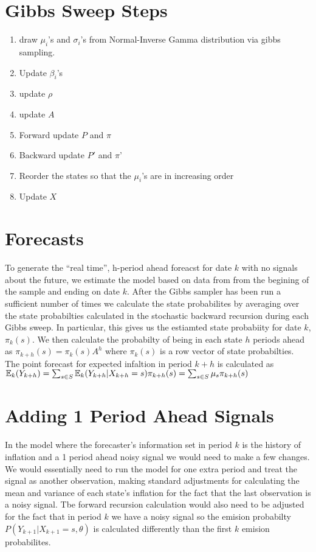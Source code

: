 \documentclass[12pt]{article}
\begin{document}
\section*{Gibbs Sweep Steps}
\begin{enumerate}
  \item draw $\mu_i$'s and $\sigma_i$'s from Normal-Inverse Gamma distribution 
  via gibbs sampling. 
  \item Update $\beta_i$'s
  \item update $\rho$
  \item update $A$
  \item Forward update $P$ and $\pi$
  \item Backward update $P'$ and $\pi$'
  \item Reorder the states so that the $\mu_i$'s are in increasing order
  \item Update $X$
\end{enumerate}

\section*{Forecasts}
To generate the ``real time'', h-period ahead foreacst for date $k$ with no signals about the future,
we estimate
the model based on data from from the begining of the sample and ending on date $k$. 
After the Gibbs sampler has been run a sufficient number of times we calculate the 
state probabilites by averaging over the state probabilties calculated in the stochastic
backward recursion during each Gibbs sweep. In particular, this gives us the estiamted 
state probabiity for date $k$, $\pi_k(s)$.  We then calculate the probabilty of being
in each state $h$ periods ahead as $\pi_{k+h}(s) = \pi_{k}(s) A^h $  where 
$\pi_{k}(s)$ is a row vector of state probabilties. The point forecast for expected 
infaltion in period $k+h$ is calculated as 
$\operatorname{\mathbb{E}}_k(Y_{k+h}) = \sum_{s \in S} \operatorname{\mathbb{E}}_k(Y_{k+h}|X_{k+h}=s) \pi_{k+h}(s) = \sum_{s \in S} \mu_s \pi_{k+h}(s) $



\section*{Adding 1 Period Ahead Signals}
In the model where the forecaster's information set in period $k$ is the history 
of inflation and a 1 period ahead noisy signal we would need to make a few changes. 
We would essentially need to run the model for one extra period and treat the signal 
as another observation, making standard adjustments for calculating the mean and variance 
of each state's inflation for the fact that the last observation is a noisy signal. Tbe
forward recursion calculation would also need to be adjusted for the fact that 
in period $k$ we have a noisy signal so the emision probabilty
 $P(Y_{k+1} | X_{k+1}=s, \theta) $ is calculated 
 differently than the first $k$ emision probabilites.
\end{document}
